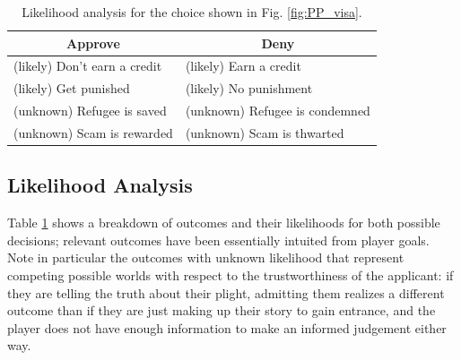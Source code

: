 \documentclass[arts,article,submit,moreauthors,pdftex,10pt,a4paper]{Definitions/mdpi}
\begin{document}
\begin{table}[H]
\centering
\begin{tabular}{l l}
  \toprule
  \multicolumn{1}{c}{\textbf{Approve}} & \multicolumn{1}{c}{\textbf{Deny}} \\
  \midrule
  (likely) Don't earn a credit & (likely) Earn a credit \\
  (likely) Get punished & (likely) No punishment \\
  (unknown) Refugee is saved & (unknown) Refugee is condemned \\
  (unknown) Scam is rewarded & (unknown) Scam is thwarted \\
  \bottomrule
\end{tabular}
\caption[\emph{Papers, Please} likelihood analysis]{Likelihood analysis for the choice shown in Fig. \ref{fig:PP_visa}.}
\label{tab:PP_likelihoods}
\end{table}

\subsection{Likelihood Analysis}

Table \ref{tab:PP_likelihoods} shows a breakdown of outcomes and their likelihoods for both possible decisions; relevant outcomes have been essentially intuited from player goals.
%
Note in particular the outcomes with unknown likelihood that represent competing possible worlds with respect to the trustworthiness of the applicant: if they are telling the truth about their plight, admitting them realizes a different outcome than if they are just making up their story to gain entrance, and the player does not have enough information to make an informed judgement either way.
\end{document}
